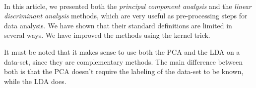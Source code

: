 \paragraph{}
In this article, we presented both the \emph{principal component analysis} and the \emph{linear
discriminant analysis} methods, which are very useful as pre-processing steps for data analysis. We
have shown that their standard definitions are limited in several ways. We have improved the
methods using the kernel trick.

It must be noted that it makes sense to use both the PCA and the LDA on a data-set, since they are
complementary methods. The main difference between both is that the PCA doesn't require the labeling
of the data-set to be known, while the LDA does.
